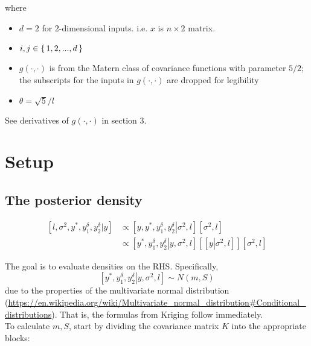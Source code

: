 \documentclass[12pt]{amsart}
\begin{document}
  where 
    \begin{itemize}
        \item $d = 2$ for 2-dimensional inputs. i.e. $x$ is $n \times 2$ matrix.
        \item $i, j \in \set{1, 2, ..., d}$
        \item $g(\cdot, \cdot)$ is from the Matern class of covariance functions with parameter $5/2$; the subscripts for the inputs in $g(\cdot, \cdot)$ are dropped for legibility 
        \item $\theta = \sqrt{5} / l$
    \end{itemize}
    
See derivatives of $g(\cdot, \cdot)$ in section 3.

\bigskip
\section{Setup}
\subsection{The posterior density}
\begin{align}
\left[ {l,{\sigma ^2},{y^*},y_1^\delta ,y_2^\delta \left| y \right.} \right] &\propto \left[ {y,{y^*},y_1^\delta ,y_2^\delta \left| {{\sigma ^2},l} \right.} \right]\left[ {{\sigma ^2},l} \right]\\
 &\propto \left[ {{y^*},y_1^\delta ,y_2^\delta \left| {y,{\sigma ^2},l} \right.} \right]\left[ {\left[ {y\left| {{\sigma ^2},l} \right.} \right]} \right]\left[ {{\sigma ^2},l} \right]
\end{align}
      
The goal is to evaluate densities on the RHS. Specifically, 
\[\left[ {{y^*},y_1^\delta ,y_2^\delta \left| {y,{\sigma ^2},l} \right.} \right] \sim N\left( {m,S} \right)\]
due to the properties of the multivariate normal distribution (\url{https://en.wikipedia.org/wiki/Multivariate_normal_distribution#Conditional_distributions}). 
That is, the formulas from Kriging follow immediately.\\

To calculate $m, S$, start by dividing the covariance matrix $K$ into the appropriate blocks:
\end{document}

